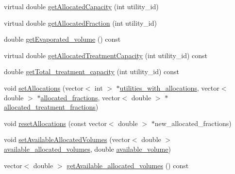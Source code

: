 \begin{DoxyCompactItemize}
virtual double \mbox{\hyperlink{classWaterSource_a44102a0eafdaebd86f0ed8dabb313733_a44102a0eafdaebd86f0ed8dabb313733}{get\+Allocated\+Capacity}} (int utility\+\_\+id)
\item 
virtual double \mbox{\hyperlink{classWaterSource_a1843ada21b8e7500d80a5a7db10621b3_a1843ada21b8e7500d80a5a7db10621b3}{get\+Allocated\+Fraction}} (int utility\+\_\+id)
\item 
double \mbox{\hyperlink{classWaterSource_a00b156a153fc24097e4c8a4e5c46c4e0_a00b156a153fc24097e4c8a4e5c46c4e0}{get\+Evaporated\+\_\+volume}} () const
\item 
virtual double \mbox{\hyperlink{classWaterSource_ab3ba86d2a3e864e435ba2b88cceea555_ab3ba86d2a3e864e435ba2b88cceea555}{get\+Allocated\+Treatment\+Capacity}} (int utility\+\_\+id) const
\item 
double \mbox{\hyperlink{classWaterSource_a6228c9aee407ca2544753dbd2792c5fb_a6228c9aee407ca2544753dbd2792c5fb}{get\+Total\+\_\+treatment\+\_\+capacity}} (int utility\+\_\+id) const
\item 
void \mbox{\hyperlink{classWaterSource_ac834762e016e796968ad286feeca7be6_ac834762e016e796968ad286feeca7be6}{set\+Allocations}} (vector$<$ int $>$ $\ast$\mbox{\hyperlink{classWaterSource_ac345583fc2d0f7e1db31ee40244d7ace_ac345583fc2d0f7e1db31ee40244d7ace}{utilities\+\_\+with\+\_\+allocations}}, vector$<$ double $>$ $\ast$\mbox{\hyperlink{classWaterSource_a2f6655a80c4847fe039987255d9d998c_a2f6655a80c4847fe039987255d9d998c}{allocated\+\_\+fractions}}, vector$<$ double $>$ $\ast$\mbox{\hyperlink{classWaterSource_aa73fe10cfc6579b2fb79529e1dde5140_aa73fe10cfc6579b2fb79529e1dde5140}{allocated\+\_\+treatment\+\_\+fractions}})
\item 
void \mbox{\hyperlink{classWaterSource_af52f39412f0d761f7e3b3369ffdf90f1_af52f39412f0d761f7e3b3369ffdf90f1}{reset\+Allocations}} (const vector$<$ double $>$ $\ast$new\+\_\+allocated\+\_\+fractions)
\item 
void \mbox{\hyperlink{classWaterSource_ae29ed4aa2b9c97c5a41772daf4631f05_ae29ed4aa2b9c97c5a41772daf4631f05}{set\+Available\+Allocated\+Volumes}} (vector$<$ double $>$ \mbox{\hyperlink{classWaterSource_a77d3fe9ea445fc987b07debdfb9e2f5b_a77d3fe9ea445fc987b07debdfb9e2f5b}{available\+\_\+allocated\+\_\+volumes}}, double \mbox{\hyperlink{classWaterSource_a49e1a191152e344e2161e8db166e067a_a49e1a191152e344e2161e8db166e067a}{available\+\_\+volume}})
\item 
vector$<$ double $>$ \mbox{\hyperlink{classWaterSource_a1087f5f2458803fd1d37383e303bd25f_a1087f5f2458803fd1d37383e303bd25f}{get\+Available\+\_\+allocated\+\_\+volumes}} () const

\end{DoxyCompactItemize}
